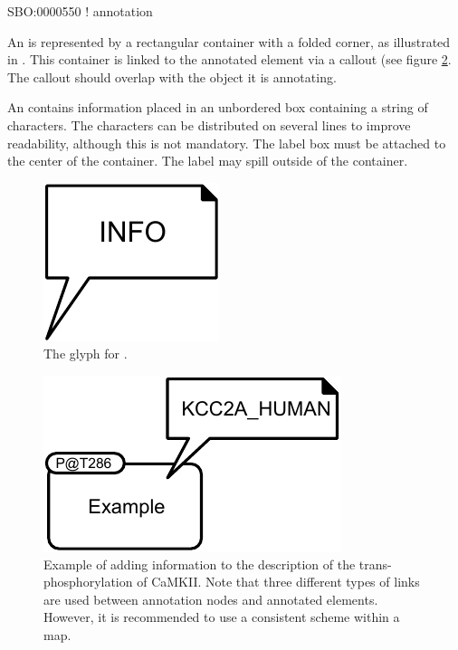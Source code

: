 \begin{glyphDescription}

\glyphSboTerm SBO:0000550 ! annotation

\glyphContainer An  is represented by a rectangular
container with a folded corner, as illustrated in
. This container is linked to the annotated element
via a callout (see figure \ref{fig:techref:ex-annotation}. The callout should
overlap with the object it is annotating.

\glyphLabel An  contains information placed in an
unbordered box containing a string of characters.  The characters can
be distributed on several lines to improve readability, although this
is not mandatory.  The label box must be attached to the center of the
container. The label may spill outside of the container.

\end{glyphDescription}

\begin{figure}[htb]
  \centering
  \includegraphics[scale = 0.3]{images/annotation}
  \caption{The \PD glyph for .}
  \label{fig:techref:annotation}
\end{figure}

\begin{figure}[htb]
  \centering
  \includegraphics[scale = 0.5]{examples/ex-annotation}
  \caption{Example of  adding information to the
    description of the trans-phosphorylation of CaMKII. Note that
    three different types of links are used between annotation nodes
    and annotated elements. However, it is recommended to use a
    consistent scheme within a map.}
  \label{fig:techref:ex-annotation}
\end{figure}

